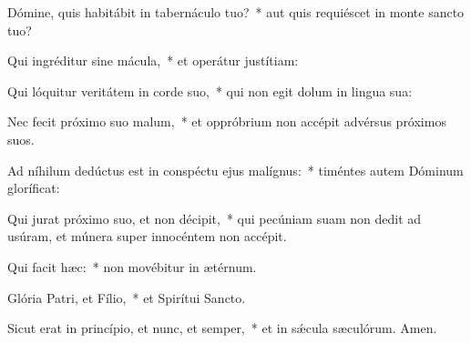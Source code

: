 \item Dómine, quis habitábit in tabernáculo tuo?~* aut quis requiéscet in monte sancto tuo?

\item Qui ingréditur sine mácula,~* et operátur justítiam:

\item Qui lóquitur veritátem in corde suo,~* qui non egit dolum in lingua sua:

\item Nec fecit próximo suo malum,~* et oppróbrium non accépit advérsus próximos suos.

\item Ad níhilum dedúctus est in conspéctu ejus malígnus:~* timéntes autem Dóminum gloríficat:

\item Qui jurat próximo suo, et non décipit,~* qui pecúniam suam non dedit ad usúram, et múnera super innocéntem non accépit.

\item Qui facit hæc:~* non movébitur in ætérnum.

\item Glória Patri, et Fílio,~* et Spirítui Sancto.

\item Sicut erat in princípio, et nunc, et semper,~* et in sǽcula sæculórum. Amen.

